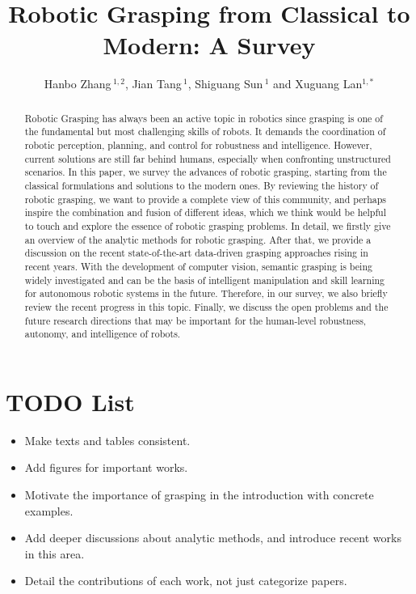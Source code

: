 \documentclass[letterpaper,10pt]{article}
\begin{document}
\title{Robotic Grasping from Classical to Modern: A Survey}

\author{Hanbo Zhang\,$^{1,2}$, Jian Tang\,$^{1}$, Shiguang Sun\,$^{1}$ and Xuguang Lan$^{1,*}$}
\address{$^{1}$Xi'an Jiaotong University, $^{2}$National University of Singapore}


\begin{abstract}
Robotic Grasping has always been an active topic in robotics since grasping is one of the fundamental but most challenging skills of robots.
It demands the coordination of robotic perception, planning, and control for robustness and intelligence. 
However, current solutions are still far behind humans, especially when confronting unstructured scenarios. 
In this paper, we survey the advances of robotic grasping, starting from the classical formulations and solutions to the modern ones. 
By reviewing the history of robotic grasping, we want to provide a complete view of this community, and perhaps inspire the combination and fusion of different ideas, which we think would be helpful to touch and explore the essence of robotic grasping problems. 
In detail, we firstly give an overview of the analytic methods for robotic grasping. 
After that, we provide a discussion on the recent state-of-the-art data-driven grasping approaches rising in recent years. 
With the development of computer vision, semantic grasping is being widely investigated and can be the basis of intelligent manipulation and skill learning for autonomous robotic systems in the future. 
Therefore, in our survey, we also briefly review the recent progress in this topic. 
Finally, we discuss the open problems and the future research directions that may be important for the human-level robustness, autonomy, and intelligence of robots.


\end{abstract}

\section*{TODO List}

\begin{itemize}
    \item Make texts and tables consistent.
    \item Add figures for important works.
    \item Motivate the importance of grasping in the introduction with concrete examples.
    \item Add deeper discussions about analytic methods, and introduce recent works in this area.
    \item Detail the contributions of each work, not just categorize papers.
\end{itemize}
\end{document}
